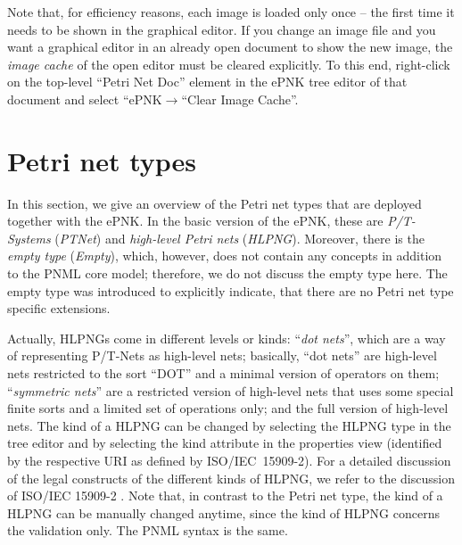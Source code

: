 Note that, for efficiency reasons, each image is loaded only once -- the first
time it needs to be shown in the graphical editor. If you change an
image file and you want a graphical editor in an already open document to
show the new image, the \emph{image cache}%
of the open editor must be cleared
explicitly. To this end, right-click on the top-level ``Petri Net Doc''
element in the ePNK tree editor of that document and select
``ePNK$\rightarrow$``Clear Image Cache''.%

\section{Petri net types} 
\label{sec:petrinettypes}

In this section, we give an overview of the Petri net types that are
deployed together with the ePNK. In the basic version of the ePNK, these
are \emph{P/T-Systems} (\emph{PTNet})%
and \emph{high-level Petri nets} (\emph{HLPNG}).%
Moreover, there is the \emph{empty type} (\emph{Empty}),%
which, however, does not contain any concepts in addition to the
PNML core model; therefore, we do not discuss the empty type here. The empty
type was introduced to explicitly indicate, that there are no Petri net type
specific extensions. 

Actually, HLPNGs come in different levels or kinds: ``\emph{dot nets}'',%
which are a way of representing P/T-Nets as high-level nets; basically, ``dot
nets'' are high-level nets restricted to the sort ``DOT'' and a minimal version of
operators on them; ``\emph{symmetric nets}''%
are a restricted version of
high-level nets that uses  some special finite sorts and a limited set of operations only;
and the full version of high-level nets. The kind of a HLPNG can be
changed by selecting the HLPNG type in the tree editor and by selecting the kind
attribute in the properties view (identified by the respective URI as defined by
ISO/IEC~15909-2).
For a detailed discussion of the legal constructs of the different kinds of HLPNG,
we refer to the discussion of ISO/IEC 15909-2 \cite{HKea09}. Note that, in
contrast to the Petri net type, the kind of a HLPNG can be manually changed anytime, since the kind of HLPNG
concerns the validation only. The PNML syntax is the same.

